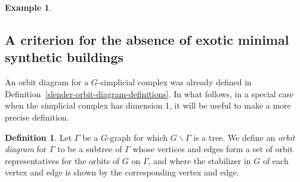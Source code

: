 \documentclass[12pt]{amsart}
\theoremstyle{plain}
\theoremstyle{definition}
\newtheorem{definition}[theorem]{Definition}
\newtheorem{example}[theorem]{Example}
\theoremstyle{remark}
\numberwithin{equation}{section}
\newcommand{\bs}{\backslash}
\begin{document}
\begin{example}
\begin{center}
    \end{center}
\end{example}


\subsection{A criterion for the absence of exotic minimal synthetic buildings}
\label{no-exotic-minimal-subsection}

An orbit diagram for a $G$-simplicial complex was already defined in Definition~\ref{slender-orbit-diagram-definitions}. In what follows, in a special case when the simplicial complex has dimension 1, it will be useful to make a more precise definition. 

\begin{definition}
Let $\Gamma$ be a $G$-graph for which $G\bs\Gamma$ is a tree.
We define an \textit{orbit diagram} for $\Gamma$ to be a subtree of $\Gamma$ whose vertices and edges form a set of orbit representatives for the orbits of $G$ on $\Gamma$, and where the stabilizer in $G$ of each vertex and edge is shown by the corresponding vertex and edge.
\end{definition}
\end{document}
